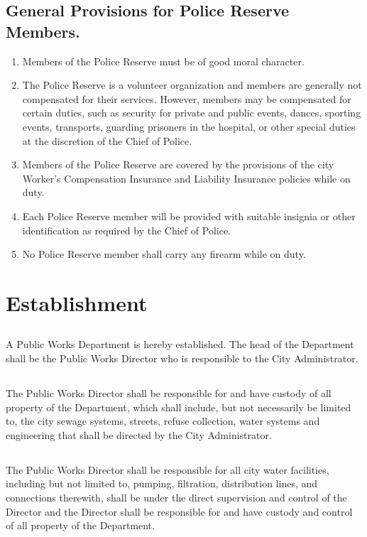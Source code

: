 \subsection{General Provisions for Police Reserve Members.}
\begin{enumerate}
    \item Members of the Police Reserve must be of good moral character.
    \item The Police Reserve is a volunteer organization and members are generally not compensated for their services. However, members may be compensated for certain duties, such as security for private and public events, dances, sporting events, transports, guarding prisoners in the hospital, or other special duties at the discretion of the Chief of Police.
    \item Members of the Police Reserve are covered by the provisions of the city Worker’s Compensation Insurance and Liability Insurance policies while on duty.
    \item Each Police Reserve member will be provided with suitable insignia or other identification as required by the Chief of Police.
    \item No Police Reserve member shall carry any firearm while on duty.
\end{enumerate}


\setcounter{section}{79}
\section{Establishment}
\subsection{}
A Public Works Department is hereby established.  The head of the Department shall be the Public Works Director who is responsible to the City Administrator.
\subsection{}
The Public Works Director shall be responsible for and have custody of all property of the Department, which shall include, but not necessarily be limited to, the city sewage systems, streets, refuse collection, water systems and engineering that shall be directed by the City Administrator.
\subsection{}
The Public Works Director shall be responsible for all city water facilities, including but not limited to, pumping, filtration, distribution lines, and connections therewith, shall be under the direct supervision and control of the Director and the Director shall be responsible for and have custody and control of all property of the Department.
